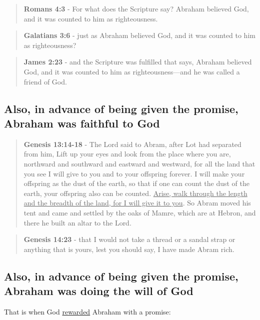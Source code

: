 \documentclass[11pt]{article}
\begin{document}
\begin{quote}
\textbf{Romans 4:3} - For what does the Scripture say? Abraham believed God, and it was counted to him as righteousness.
\end{quote}

\begin{quote}
\textbf{Galatians 3:6} - just as Abraham believed God, and it was counted to him as righteousness?
\end{quote}

\begin{quote}
\textbf{James 2:23} - and the Scripture was fulfilled that says, Abraham believed God, and it was counted to him as righteousness—and he was called a friend of God.
\end{quote}

\subsection{Also, in advance of being given the promise, Abraham was faithful to God}
\label{sec:orgf76efe7}
\begin{quote}
\textbf{Genesis 13:14-18} - The Lord said to Abram, after Lot had separated from him, Lift up your eyes and look from the place where you are, northward and southward and eastward and westward, for all the land that you see I will give to you and to your offspring forever. I will make your offspring as the dust of the earth, so that if one can count the dust of the earth, your offspring also can be counted. \uline{Arise, walk through the length and the breadth of the land, for I will give it to you}. So Abram moved his tent and came and settled by the oaks of Mamre, which are at Hebron, and there he built an altar to the Lord.
\end{quote}

\begin{quote}
\textbf{Genesis 14:23} - that I would not take a thread or a sandal strap or anything that is yours, lest you should say, I have made Abram rich.
\end{quote}

\subsection{Also, in advance of being given the promise, Abraham was doing the will of God}
\label{sec:org90f1a9e}
That is when God \uline{rewarded} Abraham with a promise:
\end{document}
